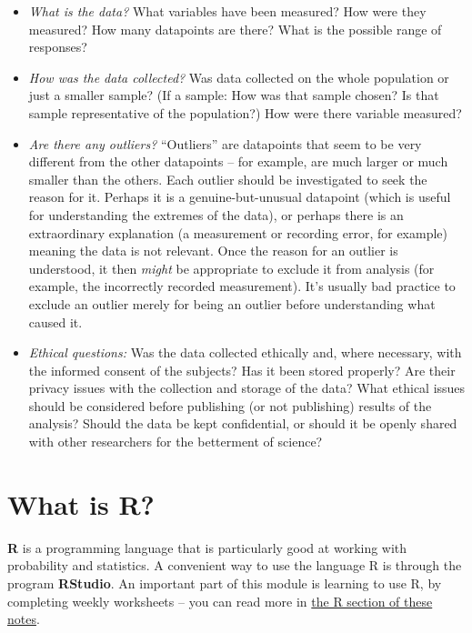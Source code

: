 \documentclass[
  a4paper,
]{book}
\providecommand{\tightlist}{%
  \setlength{\itemsep}{0pt}\setlength{\parskip}{0pt}}
\theoremstyle{definition}
\theoremstyle{definition}
\theoremstyle{definition}
\theoremstyle{definition}
\theoremstyle{remark}
\begin{document}
\begin{itemize}
\tightlist
\item
  \emph{What is the data?} What variables have been measured? How were they measured? How many datapoints are there? What is the possible range of responses?
\item
  \emph{How was the data collected?} Was data collected on the whole population or just a smaller sample? (If a sample: How was that sample chosen? Is that sample representative of the population?) How were there variable measured?
\item
  \emph{Are there any outliers?} ``Outliers'' are datapoints that seem to be very different from the other datapoints -- for example, are much larger or much smaller than the others. Each outlier should be investigated to seek the reason for it. Perhaps it is a genuine-but-unusual datapoint (which is useful for understanding the extremes of the data), or perhaps there is an extraordinary explanation (a measurement or recording error, for example) meaning the data is not relevant. Once the reason for an outlier is understood, it then \emph{might} be appropriate to exclude it from analysis (for example, the incorrectly recorded measurement). It's usually bad practice to exclude an outlier merely for being an outlier before understanding what caused it.
\item
  \emph{Ethical questions:} Was the data collected ethically and, where necessary, with the informed consent of the subjects? Has it been stored properly? Are their privacy issues with the collection and storage of the data? What ethical issues should be considered before publishing (or not publishing) results of the analysis? Should the data be kept confidential, or should it be openly shared with other researchers for the betterment of science?
\end{itemize}

\hypertarget{what-is-R}{%
\section{What is R?}\label{what-is-R}}

\textbf{R} is a programming language that is particularly good at working with probability and statistics. A convenient way to use the language R is through the program \textbf{RStudio}. An important part of this module is learning to use R, by completing weekly worksheets -- you can read more in \protect\hyperlink{R}{the R section of these notes}.
\end{document}
